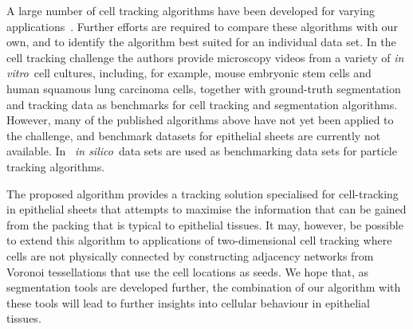 \documentclass[a4paper,11pt]{article}
\newcommand{\insilico}{\textit{in silico}~}
\newcommand{\invitro}{\textit{in vitro}~}
\begin{document}
A large number of cell tracking algorithms have been developed for varying applications~\cite{Mashburn2012, Cilla2015, Padfield2011, Youssef2011,Schiegg2013,Heller2016,Liu2014,Raffel2007,Kofahi2010,Amat2014,Wait2014, Winter2011, Sommer2011, Bellaiche2011, Aly2014, Wang2010, Puliafito2012, Aigouy2010}. 
Further efforts are required to compare these algorithms with our own, and to identify the algorithm best suited for an individual data set. 
In the cell tracking challenge \cite{Maska2014} the authors provide microscopy videos from a variety of \invitro cell cultures, including, for example, mouse embryonic stem cells and human squamous lung carcinoma cells, together with ground-truth segmentation and tracking data as benchmarks for cell tracking and segmentation algorithms. 
However, many of the published algorithms above have not yet been applied to the challenge, and benchmark datasets for epithelial sheets are currently not available. 
In~\cite{Chenouard2014} \insilico data sets are used as benchmarking data sets for particle tracking algorithms.

The proposed algorithm provides a tracking solution specialised for cell-tracking in epithelial sheets that attempts to maximise the information that can be gained from the packing that is typical to epithelial tissues. 
It may, however, be possible to extend this algorithm to applications of two-dimensional cell tracking where cells are not physically connected by constructing adjacency networks from Voronoi tessellations that use the cell locations as seeds.  
We hope that, as segmentation tools are developed further, the combination of our algorithm with these tools will lead to further insights into cellular behaviour in epithelial tissues.


\end{document}
